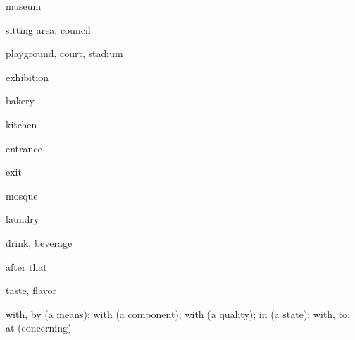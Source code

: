 \begin{flashcard}{\LARGE museum}
\LARGE {}
\end{flashcard}
\begin{flashcard}{\LARGE sitting area, council}
\LARGE {}
\end{flashcard}
\begin{flashcard}{\LARGE playground, court, stadium}
\LARGE {}
\end{flashcard}
\begin{flashcard}{\LARGE exhibition}
\LARGE {}
\end{flashcard}
\begin{flashcard}{\LARGE bakery}
\LARGE {}
\end{flashcard}
\begin{flashcard}{\LARGE kitchen}
\LARGE {}
\end{flashcard}
\begin{flashcard}{\LARGE entrance}
\LARGE {}
\end{flashcard}
\begin{flashcard}{\LARGE exit}
\LARGE {}
\end{flashcard}
\begin{flashcard}{\LARGE mosque}
\LARGE {}
\end{flashcard}
\begin{flashcard}{\LARGE laundry}
\LARGE {}
\end{flashcard}
\begin{flashcard}{\LARGE drink, beverage}
\LARGE {}
\end{flashcard}
\begin{flashcard}{\LARGE after that}
\LARGE {}
\end{flashcard}
\begin{flashcard}{\LARGE taste, flavor}
\LARGE {}
\end{flashcard}
\begin{flashcard}{\LARGE with, by (a means); with (a component); with (a quality); in (a state); with, to, at (concerning)}
\LARGE {}
\end{flashcard}
